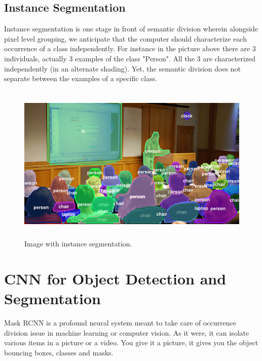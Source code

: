 \subsection{
Instance Segmentation
}
Instance segmentation is one stage in front of semantic division wherein alongside pixel level grouping, we anticipate that the computer should characterize each occurrence of a class independently. For instance in the picture above there are 3 individuals, actually 3 examples of the class "Person". All the 3 are characterized independently (in an alternate shading). Yet, the semantic division does not separate between the examples of a specific class.
\begin{figure}[H]
  \centering
  \includegraphics[height=3in]{images/instance.png}
   \caption{Image with instance segmentation.}
\end{figure}

\section{CNN for Object Detection and  Segmentation }
Mask RCNN is a profound neural system meant to take care of occurrence division issue in machine learning or computer vision. As it were, it can isolate various items in a picture or a video. You give it a picture, it gives you the object bouncing boxes, classes and masks. 

